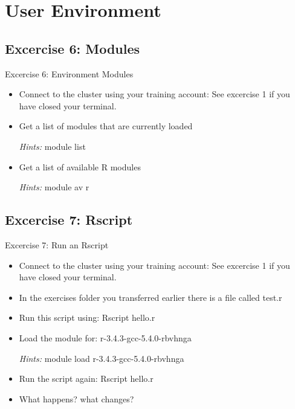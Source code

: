 \documentclass[handout]{beamer} %
\begin{document}
\section{User Environment}
\subsection{Excercise 6: Modules}
\begin{frame}[fragile]{Excercise 6: Environment Modules}
\begin{itemize}
\item{Connect to the cluster using your training account: See excercise 1 if you have closed your terminal. }
\item{Get a list of modules that are currently loaded}
\item[\emph{Hints:}]{\alert{module list}}
\item{Get a list of available R modules}
\item[\emph{Hints:}]{\alert{module av r}}
\end{itemize}
\end{frame}

\subsection{Excercise 7: Rscript}
\begin{frame}[fragile]{Excercise 7: Run an Rscript}
\begin{itemize}
\item{Connect to the cluster using your training account: See excercise 1 if you have closed your terminal.}
\item{In the exercises folder you transferred earlier there is a file called test.r}
\item{Run this script using: Rscript hello.r }
\item{Load the module for: r-3.4.3-gcc-5.4.0-rbvhnga}
\item[\emph{Hints:}]{\alert{module load r-3.4.3-gcc-5.4.0-rbvhnga}}
\item{Run the script again: Rscript hello.r}
\item{What happens? what changes?}
\end{itemize}
\end{frame}
\end{document}
